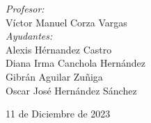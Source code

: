 \begin{titlepage}
    \vspace{10mm}
    \begin{minipage}{0.7\textwidth}
        \begin{flushleft} \large
            \emph{Profesor:}\\
                Víctor Manuel Corza Vargas\\
                \vspace{3mm}
                \emph{Ayudantes:}\\
                Alexis Hérnandez Castro \\
                Diana Irma Canchola Hernández \\
                Gibrán Aguilar Zuñiga \\
                Oscar José Hernández Sánchez 
        \end{flushleft}
    \end{minipage}
    \vspace{6mm}    
    \makeatother
    {\large 11 de Diciembre de 2023}\\[2cm]
    \vfill 
\end{titlepage}